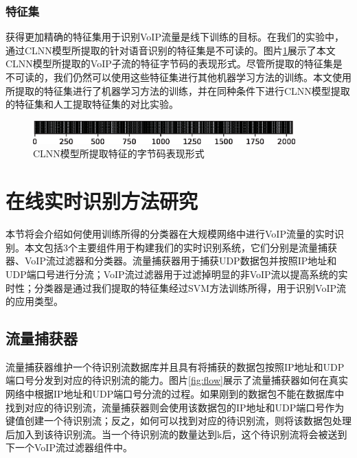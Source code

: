 \subsubsection{特征集}
获得更加精确的特征集用于识别VoIP流量是线下训练的目标。在我们的实验中，通过CLNN模型所提取的针对语音识别的特征集是不可读的。图片\ref{fig:feature}展示了本文CLNN模型所提取的VoIP子流的特征字节码的表现形式。尽管所提取的特征集是不可读的，我们仍然可以使用这些特征集进行其他机器学习方法的训练。本文使用所提取的特征集进行了机器学习方法的训练，并在同种条件下进行CLNN模型提取的特征集和人工提取特征集的对比实验。
\begin{figure}[thb]
\begin{center}
\includegraphics[width=0.9\textwidth]{figures/feature.eps}
\caption{CLNN模型所提取特征的字节码表现形式}\label{fig:feature}
\end{center}
\end{figure}

\section{在线实时识别方法研究}
\label{sec:onlineidentification}
本节将会介绍如何使用训练所得的分类器在大规模网络中进行VoIP流量的实时识别。本文包括3个主要组件用于构建我们的实时识别系统，它们分别是流量捕获器、VoIP流过滤器和分类器。流量捕获器用于捕获UDP数据包并按照IP地址和UDP端口号进行分流；VoIP流过滤器用于过滤掉明显的非VoIP流以提高系统的实时性；分类器是通过我们提取的特征集经过SVM方法训练所得，用于识别VoIP流的应用类型。

\subsection{流量捕获器}
流量捕获器维护一个待识别流数据库并且具有将捕获的数据包按照IP地址和UDP端口号分发到对应的待识别流的能力。图片\ref{fig:flow}展示了流量捕获器如何在真实网络中根据IP地址和UDP端口号分流的过程。如果刚到的数据包不能在数据库中找到对应的待识别流，流量捕获器则会使用该数据包的IP地址和UDP端口号作为键值创建一个待识别流；反之，如何可以找到对应的待识别流，则将该数据包处理后加入到该待识别流。当一个待识别流的数量达到k后，这个待识别流将会被送到下一个VoIP流过滤器组件中。



